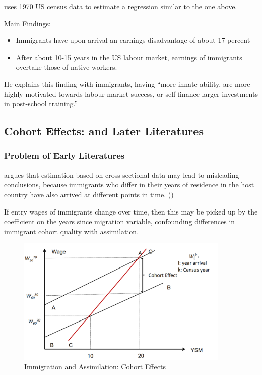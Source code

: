             \cite{chiswick_effect_1978} uses 1970 US census data to estimate a regression similar to the one above.
            
            Main Findings:
            
            \begin{itemize}
                \item Immigrants have upon arrival an earnings disadvantage of about 17 percent
                \item After about 10-15 years in the US labour market, earnings of immigrants overtake those of native workers.
            \end{itemize}
            
            He explains this finding with immigrants, having “more innate ability, are more highly motivated towards labour market success, or self-finance larger investments in post-school training.”

    \subsection{Cohort Effects: \cite{borjas_assimilation_1985} and Later Literatures}

        \subsubsection{Problem of Early Literatures}

            \cite{borjas_assimilation_1985} argues that estimation based on cross-sectional data may lead to misleading conclusions, because immigrants who differ in their years of residence in the host country have also arrived at different points in time. ()
            
            If entry wages of immigrants change over time, then this may be picked up by the coefficient on the years since migration variable, confounding differences in immigrant cohort quality with assimilation.
            
            \begin{figure}[H]
                \centering
                \includegraphics[width=4in]{images/ch11/14.png}
                \caption{Immigration and Assimilation: Cohort Effects}
            \end{figure}

